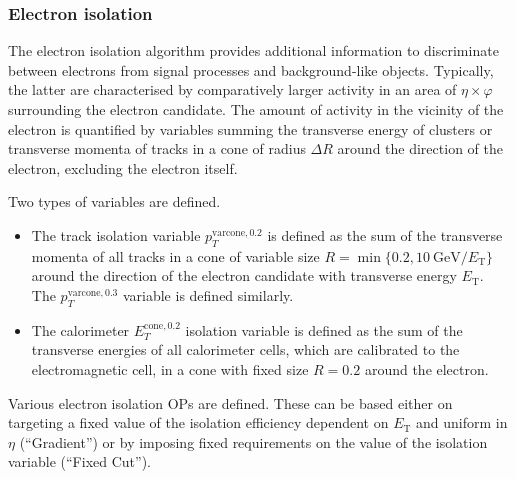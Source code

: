 \subsubsection{Electron isolation}
The electron isolation algorithm provides additional information to discriminate between electrons from signal processes and background-like objects. Typically, the latter are characterised by comparatively larger activity in an area of \(\eta \times \varphi\) surrounding the electron candidate.
The amount of activity in the vicinity of the electron is quantified by variables summing the transverse energy of clusters or transverse momenta of tracks in a cone of radius \(\Delta R\) around the direction of the electron, excluding the electron itself.

Two types of variables are defined.
\begin{itemize}
	\item The track isolation variable \(p_{T}^{\text{varcone}, 0.2}\) is defined as the sum of the transverse momenta of all tracks in a cone of variable size \(R = \min \{0.2, \SI{10}{\giga\electronvolt} / E_{\text{T}}\}\) around the direction of the electron candidate with transverse energy \(E_{\text{T}}\).
	The \(p_{T}^{\text{varcone}, 0.3}\) variable is defined similarly.
	\item The calorimeter \(E_{T}^{\text{cone}, 0.2}\) isolation variable is defined as the sum of the transverse energies of all calorimeter cells, which are calibrated to the electromagnetic cell, in a cone with fixed size \(R=0.2\) around the electron.
\end{itemize}

Various electron isolation OPs are defined. These can be based either on targeting a fixed value of the isolation efficiency dependent on \(E_{\text{T}}\) and uniform in \(\eta\) (``Gradient'') or by imposing fixed requirements on the value of the isolation variable (``Fixed Cut'').

